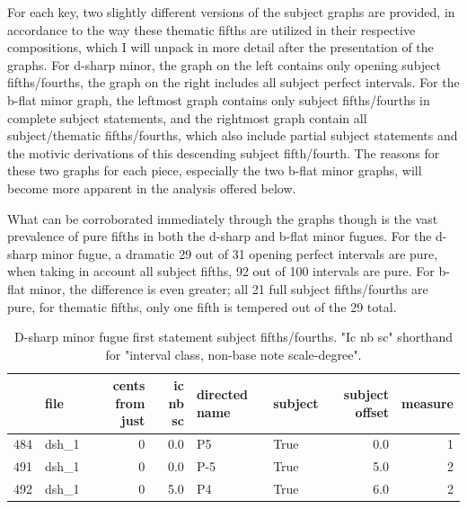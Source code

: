 For each key, two slightly different versions of the subject graphs are
provided, in accordance to the way these thematic fifths are utilized in
their respective compositions, which I will unpack in more detail after
the presentation of the graphs. For d-sharp minor, the graph on the left
contains only opening subject fifths/fourths, the graph on the right
includes all subject perfect intervals. For the b-flat minor graph, the
leftmost graph contains only subject fifths/fourths in complete subject
statements, and the rightmost graph contain all subject/thematic
fifths/fourths, which also include partial subject statements and the
motivic derivations of this descending subject fifth/fourth. The reasons
for these two graphs for each piece, especially the two b-flat minor
graphs, will become more apparent in the analysis offered below.

What can be corroborated immediately through the graphs though is the
vast prevalence of pure fifths in both the d-sharp and b-flat minor
fugues. For the d-sharp minor fugue, a dramatic 29 out of 31 opening
perfect intervals are pure, when taking in account all subject fifths,
92 out of 100 intervals are pure. For b-flat minor, the difference is
even greater; all 21 full subject fifths/fourths are pure, for thematic
fifths, only one fifth is tempered out of the 29 total.

\begin{singlespace}
\begin{table}[H]
\centering
\tiny
\begin{tabular}{|llrrllrr|}
\hline
\textbf{{}} & \textbf{  file} & \textbf{ cents from just} & \textbf{ ic nb sc} & \textbf{directed name} & \textbf{subject} & \textbf{ subject offset} & \textbf{ measure }\\
\hline
484 &  dsh\_1 &                0 &       0.0 &            P5 &    True &             0.0 &        1 \\
491 &  dsh\_1 &                0 &       0.0 &           P-5 &    True &             5.0 &        2 \\
492 &  dsh\_1 &                0 &       5.0 &            P4 &    True &             6.0 &        2 \\
\hline
\end{tabular}
\caption[D-sharp minor fugue subject fifths/fourths (first statement). ]{D-sharp minor fugue first statement subject fifths/fourths. "Ic nb sc" shorthand for "interval class, non-base note scale-degree".}
\end{table}
\normalsize
\end{singlespace}



